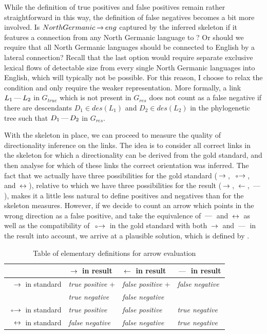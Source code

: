 While the definition of true positives and false positives remain rather straightforward in this way, the definition of false negatives becomes a bit more involved. Is $North Germanic \arrowLA eng$ captured by the inferred skeleton if it features a connection from any North Germanic language to ? Or should we require that all North Germanic languages should be connected to English by a lateral connection? Recall that the last option would require separate exclusive lexical flows of detectable size from every single North Germanic languages into English, which will typically not be possible. For this reason, I choose to relax the condition and only require the weaker representation. More formally, a link $L_1 \arrowLL L_2$ in $G_{true}$ which is not present in $G_{res}$ does not count as a false negative if there are descendants $D_1 \in des(L_1)$ and $D_2 \in des(L_2)$ in the phylogenetic tree such that $D_1 \arrowLL D_2$ in $G_{res}$.

With the skeleton in place, we can proceed to measure the quality of directionality inference on the links. The idea is to consider all correct links in the skeleton for which a directionality can be derived from the gold standard, and then analyse for which of these links the correct orientation was inferred. The fact that we actually have three possibilities for the gold standard ($\arrowLA$, $\arrowOA$, and $\arrowAA$), relative to which we have three possibilities for the result ($\arrowLA$, $\arrowAL$, $\arrowLL$), makes it a little less natural to define positives and negatives than for the skeleton measures. However, if we decide to count an arrow which points in the wrong direction as a false positive, and take the equivalence of $\arrowLL$ and $\arrowAA$ as well as the compatibility of $\arrowOA$ in the gold standard with both $\arrowLA$ and $\arrowLL$ in the result into account, we arrive at a plausible solution, which is defined by .

\begin{table}
\centering
\begin{tabular}{rlll}
  \hline \hline
  & $\arrowLA$ in result & $\arrowAL$ in result & $\arrowLL$ in result \\ \hline
  $\arrowLA$ in standard & \textit{true positive} + & \textit{false positive} + & \textit{false negative}\\ 
                                  & \textit{true negative} & \textit{false negative} & \\ \hline
  $\arrowOA$ in standard & \textit{true positive} & \textit{false positive} & \textit{true negative}\\ \hline
  $\arrowAA$ in standard & \textit{false negative} & \textit{false negative} & \textit{true negative}\\ \hline
\end{tabular}
 \caption{Table of elementary definitions for arrow evaluation}
 \label{arrow-eval-def}
\end{table}

